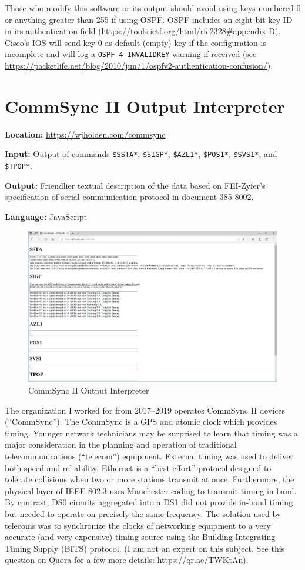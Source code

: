 \documentclass[12pt]{article}
\begin{document}
Those who modify this software or its output should avoid using keys numbered 0 or anything greater than 255 if using OSPF.
OSPF includes an eight-bit key ID in its authentication field (\url{https://tools.ietf.org/html/rfc2328#appendix-D}).
Cisco's IOS will send key 0 as default (empty) key if the configuration is incomplete and will log a \texttt{OSPF-4-INVALIDKEY} warning if received (see \url{https://packetlife.net/blog/2010/jun/1/ospfv2-authentication-confusion/}).

\section{CommSync II Output Interpreter}

\noindent \textbf{Location:} \url{https://wjholden.com/commsync}

\noindent \textbf{Input:} Output of commands  \texttt{\$SSTA*}, \texttt{\$SIGP*}, \texttt{\$AZL1*}, \texttt{\$POS1*}, \texttt{\$SVS1*}, and \texttt{\$TPOP*}.

\noindent \textbf{Output:}  Friendlier textual description of the data based on FEI-Zyfer's specification of serial communication protocol in document 385-8002.

\noindent \textbf{Language:} JavaScript

\begin{figure}[h]
\centering
\includegraphics[width=.80\textwidth]{CommSync}
\caption{CommSync II Output Interpreter}
\label{fig:CommSync}
\end{figure}

The organization I worked for from 2017--2019 operates CommSync II devices (``CommSync'').
The CommSync is a GPS and atomic clock which provides timing.
Younger network technicians may be surprised to learn that timing was a major consideration in the planning and operation of traditional telecommunications (``telecom'') equipment.
External timing was used to deliver both speed and reliability.
Ethernet is a ``best effort'' protocol designed to tolerate collisions when two or more stations transmit at once.
Furthermore, the physical layer of IEEE 802.3 uses Manchester coding to transmit timing in-band.
By contrast, DS0 circuits aggregated into a DS1 did not provide in-band timing but needed to operate on precisely the same frequency.
The solution used by telecoms was to synchronize the clocks of networking equipment to a very accurate (and very expensive) timing source using the Building Integrating Timing Supply (BITS) protocol.
(I am not an expert on this subject. See this question on Quora for a few more details: \url{https://qr.ae/TWKtAn}).
\end{document}
